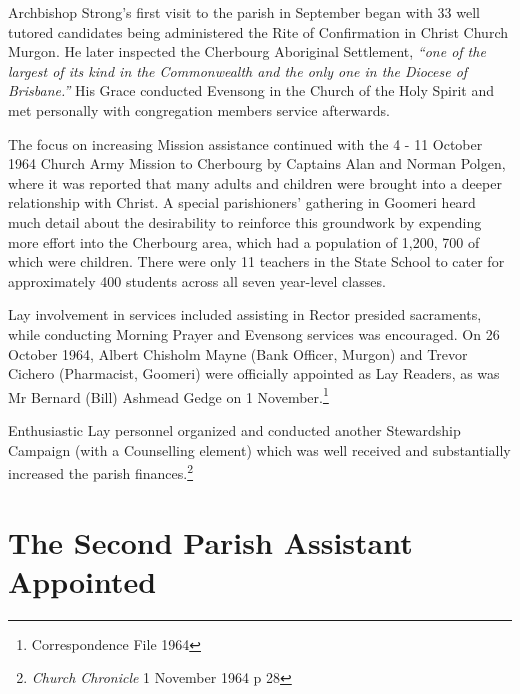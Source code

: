 Archbishop Strong's first visit to the parish in September began with 33 well tutored candidates being administered the Rite of Confirmation in Christ Church Murgon. He later inspected the Cherbourg Aboriginal Settlement, \emph{``one of the largest of its kind in the Commonwealth and the only one in the Diocese of Brisbane.''} His Grace conducted Evensong in the Church of the Holy Spirit and met personally with congregation members service afterwards.



The focus on increasing Mission assistance continued with the 4 - 11 October 1964 Church Army Mission to Cherbourg by Captains Alan and Norman Polgen, where it was reported that many adults and children were brought into a deeper relationship with Christ. A special parishioners' gathering in Goomeri heard much detail about the desirability to reinforce this groundwork by expending more effort into the Cherbourg area, which had a population of 1,200, 700 of which were children. There were only 11 teachers in the State School to cater for approximately 400 students across all seven year-level classes.



Lay involvement in services included assisting in Rector presided sacraments, while conducting Morning Prayer and Evensong services was encouraged. On 26 October 1964, Albert Chisholm Mayne (Bank Officer, Murgon) and Trevor Cichero (Pharmacist, Goomeri) were officially appointed as Lay Readers, as was Mr Bernard (Bill) Ashmead Gedge on 1 November.\footnote{Correspondence File 1964}


Enthusiastic Lay personnel organized and conducted another Stewardship Campaign (with a Counselling element) which was well received and substantially increased the parish finances.\footnote{\emph{Church Chronicle} 1 November 1964 p 28}


\section{The Second Parish Assistant Appointed}









